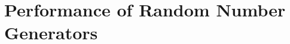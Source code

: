 %
%
%
%

\chapter{Performance of Random Number Generators}
\label{chap:Performance of Random Number Generators}

\system

\compilerthree

